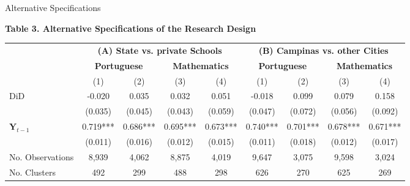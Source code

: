 \documentclass{beamer}
\begin{document}
\begin{frame} {Alternative Specifications}
 \begin{table}[h]                                    \label{table:AlternativeSpecification}                        \centering            \textbf{Table 3. Alternative Specifications of the Research Design} \\             
\begin{adjustbox}{max width=\textwidth}          
\begin{tabular}{@{\extracolsep{4pt}}l*{8}{c}@{}}             \toprule             & \multicolumn{4}{c}{\textbf{(A) State vs. private Schools}} &            \multicolumn{4}{c}{\textbf{(B) Campinas vs. other Cities}} \\            \cline{2-5}              \cline{6-9}                    & \multicolumn{2}{c}{\textbf{Portuguese}} &                    \multicolumn{2}{c}{\textbf{Mathematics}} &                    \multicolumn{2}{c}{\textbf{Portuguese}} &            \multicolumn{2}{c}{\textbf{Mathematics}} \\            \cline{2-3}                    \cline{4-5}                    \cline{6-7}            \cline{8-9}          
                    &         (1)   &         (2)   &         (3)   &         (4)   &         (1)   &         (2)   &         (3)   &         (4)   \\
\hline
DiD                 &      -0.020   &      0.035   &      0.032   &      0.051   &      -0.018   &   0.099      &   0.079      &        0.158 \\
                    &    (0.035)   &    (0.045)   &    (0.043)   &    (0.059)   &   (0.047)    &  (0.072)     &   (0.056)    &  (0.092)     \\
$\mathbf{Y}_{t-1}$              &       0.719***&       0.686***&              0.695*** &      0.673***         &  0.740***     &   0.701***    &              0.678*** &      0.671***         \\
                    &    (0.011)   &    (0.016)   &       (0.012)        &    (0.015)           &   (0.011)    &   (0.018)    &              (0.012) &      (0.017)         \\
\hline
No. Observations    &       8,939   &        4,062   &       8,875   &        4,019   &   9,647       &     3,075      &         9,598 &    3,024       \\
No. Clusters        &      492         &    299           &              488 &      298         &    626           &     270          &              625 &     269          \\

\end{tabular}
\end{adjustbox}
\end{table}
\end{frame}
\end{document}
